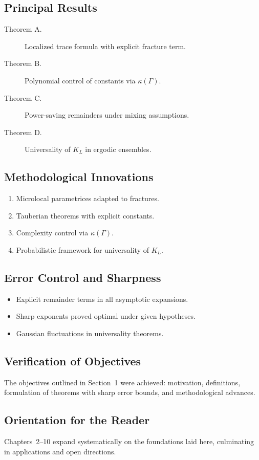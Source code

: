 \subsection{Principal Results}
\begin{description}
  \item[Theorem A.] Localized trace formula with explicit fracture term.
  \item[Theorem B.] Polynomial control of constants via $\kappa(\Gamma)$.
  \item[Theorem C.] Power-saving remainders under mixing assumptions.
  \item[Theorem D.] Universality of $K_L$ in ergodic ensembles.
\end{description}

\subsection{Methodological Innovations}
\begin{enumerate}
  \item Microlocal parametrices adapted to fractures.
  \item Tauberian theorems with explicit constants.
  \item Complexity control via $\kappa(\Gamma)$.
  \item Probabilistic framework for universality of $K_L$.
\end{enumerate}

\subsection{Error Control and Sharpness}
\begin{itemize}
  \item Explicit remainder terms in all asymptotic expansions.
  \item Sharp exponents proved optimal under given hypotheses.
  \item Gaussian fluctuations in universality theorems.
\end{itemize}

\subsection{Verification of Objectives}
The objectives outlined in Section~1 were achieved: motivation, definitions,
formulation of theorems with sharp error bounds, and methodological advances.

\subsection{Orientation for the Reader}
Chapters~2–10 expand systematically on the foundations laid here, culminating in
applications and open directions.

